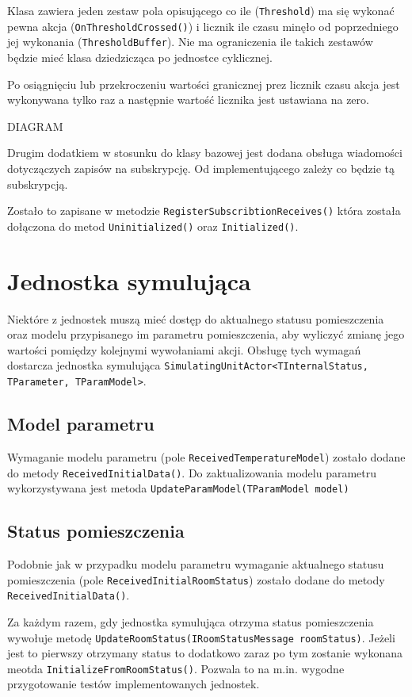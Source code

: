 Klasa zawiera jeden zestaw pola opisującego co ile (\lstinline{Threshold}) ma się wykonać pewna akcja (\lstinline{OnThresholdCrossed()}) i licznik ile czasu minęło od poprzedniego jej wykonania (\lstinline{ThresholdBuffer}). Nie ma ograniczenia ile takich zestawów będzie mieć klasa dziedzicząca po jednostce cyklicznej.

Po osiągnięciu lub przekroczeniu wartości granicznej prez licznik czasu akcja jest wykonywana tylko raz a następnie wartość licznika jest ustawiana na zero.

DIAGRAM

Drugim dodatkiem w stosunku do klasy bazowej jest dodana obsługa wiadomości dotyczączych zapisów na subskrypcję. Od implementującego zależy co będzie tą subskrypcją.

Zostało to zapisane w metodzie \lstinline{RegisterSubscribtionReceives()} która została dołączona do metod \lstinline{Uninitialized()} oraz \lstinline{Initialized()}. 

\section{Jednostka symulująca} \label{subsec:simUnit}
Niektóre z jednostek muszą mieć dostęp do aktualnego statusu pomieszczenia oraz modelu przypisanego im parametru pomieszczenia, aby wyliczyć zmianę jego wartości pomiędzy kolejnymi wywołaniami akcji. Obsługę tych wymagań dostarcza jednostka symulująca \lstinline{SimulatingUnitActor<TInternalStatus, TParameter, TParamModel>}.

\subsection*{Model parametru}
Wymaganie modelu parametru (pole \lstinline{ReceivedTemperatureModel}) zostało dodane do metody \lstinline{ReceivedInitialData()}.
Do zaktualizowania modelu parametru wykorzystywana jest metoda \lstinline{UpdateParamModel(TParamModel model)}

\subsection*{Status pomieszczenia}
Podobnie jak w przypadku modelu parametru wymaganie aktualnego statusu pomieszczenia (pole \lstinline{ReceivedInitialRoomStatus}) zostało dodane do metody \lstinline{ReceivedInitialData()}.

Za każdym razem, gdy jednostka symulująca otrzyma status pomieszczenia wywołuje metodę \lstinline{UpdateRoomStatus(IRoomStatusMessage roomStatus)}.
Jeżeli jest to pierwszy otrzymany status to dodatkowo zaraz po tym zostanie wykonana meotda \lstinline{InitializeFromRoomStatus()}. Pozwala to na m.in. wygodne przygotowanie testów implementowanych jednostek. 

